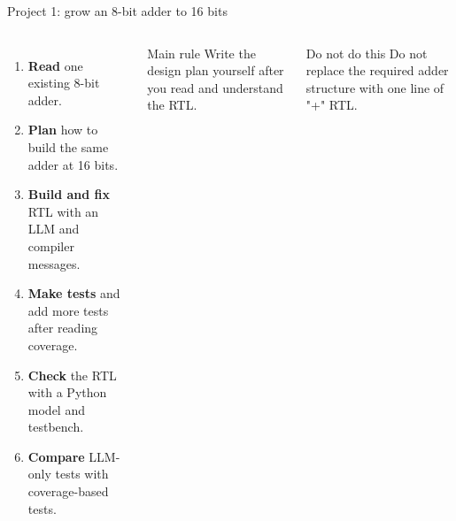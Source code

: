 \documentclass[aspectratio=169,11pt]{beamer}
\begin{document}
\begin{frame}{Project 1: grow an 8-bit adder to 16 bits}
  \begin{columns}[T,onlytextwidth]
      \small
      \begin{enumerate}
        \item \textbf{Read} one existing 8-bit adder.
        \item \textbf{Plan} how to build the same adder at 16 bits.
        \item \textbf{Build and fix} RTL with an LLM and compiler messages.
        \item \textbf{Make tests} and add more tests after reading coverage.
        \item \textbf{Check} the RTL with a Python model and testbench.
        \item \textbf{Compare} LLM-only tests with coverage-based tests.
      \end{enumerate}
      \begin{card}[fontupper=\footnotesize]{Main rule}
        Write the design plan yourself after you read and understand the RTL.
      \end{card}
      \vspace{7pt}
      \begin{alertcard}[fontupper=\footnotesize]{Do not do this}
        Do not replace the required adder structure with one line of "+" RTL.
      \end{alertcard}
  \end{columns}
\end{frame}
\end{document}
